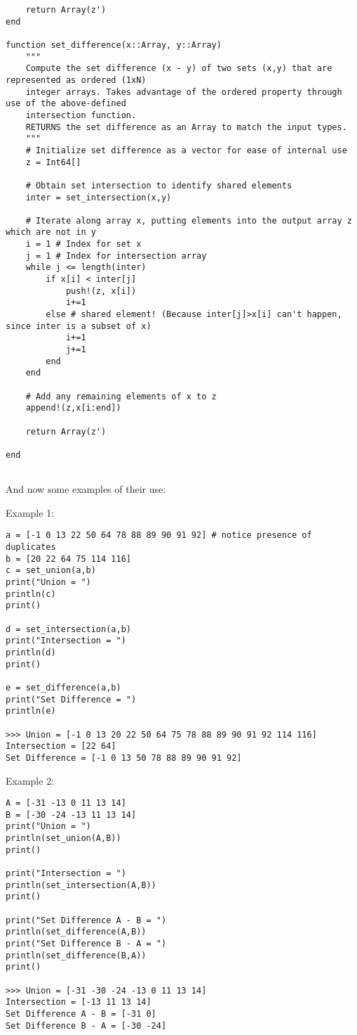 \documentclass[8pt]{article}
\begin{document}
\begin{verbatim}
    return Array(z')
end

function set_difference(x::Array, y::Array)
    """
    Compute the set difference (x - y) of two sets (x,y) that are represented as ordered (1xN) 
    integer arrays. Takes advantage of the ordered property through use of the above-defined
    intersection function. 
    RETURNS the set difference as an Array to match the input types.
    """
    # Initialize set difference as a vector for ease of internal use
    z = Int64[]

    # Obtain set intersection to identify shared elements
    inter = set_intersection(x,y)

    # Iterate along array x, putting elements into the output array z which are not in y
    i = 1 # Index for set x
    j = 1 # Index for intersection array
    while j <= length(inter)
        if x[i] < inter[j]
            push!(z, x[i])
            i+=1
        else # shared element! (Because inter[j]>x[i] can't happen, since inter is a subset of x)
            i+=1
            j+=1
        end
    end

    # Add any remaining elements of x to z
    append!(z,x[i:end])

    return Array(z')

end
    
\end{verbatim}

And now some examples of their use:

Example 1:
\begin{verbatim}
a = [-1 0 13 22 50 64 78 88 89 90 91 92] # notice presence of duplicates
b = [20 22 64 75 114 116]
c = set_union(a,b)
print("Union = ")
println(c)
print()

d = set_intersection(a,b)
print("Intersection = ")
println(d)
print()

e = set_difference(a,b)
print("Set Difference = ")
println(e)

>>> Union = [-1 0 13 20 22 50 64 75 78 88 89 90 91 92 114 116]
Intersection = [22 64]
Set Difference = [-1 0 13 50 78 88 89 90 91 92]
\end{verbatim}

Example 2:
\begin{verbatim}
A = [-31 -13 0 11 13 14]
B = [-30 -24 -13 11 13 14]
print("Union = ")
println(set_union(A,B))
print()

print("Intersection = ")
println(set_intersection(A,B))
print()

print("Set Difference A - B = ")
println(set_difference(A,B))
print("Set Difference B - A = ")
println(set_difference(B,A))
print()

>>> Union = [-31 -30 -24 -13 0 11 13 14]
Intersection = [-13 11 13 14]
Set Difference A - B = [-31 0]
Set Difference B - A = [-30 -24]
\end{verbatim}
\end{document}
